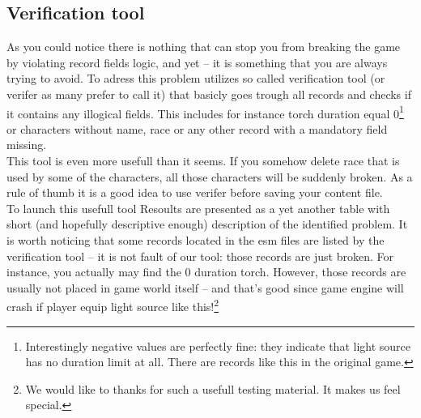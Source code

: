 \subsection{Verification tool}
As you could notice there is nothing that can stop you from breaking the game by violating record fields logic, and yet -- it is something that you are always trying to avoid. To adress this problem \OCS{} utilizes so called verification tool (or verifer as many prefer to call it) that basicly goes trough all records and checks if it contains any illogical fields. This includes for instance torch duration equal 0\footnote{Interestingly negative values are perfectly fine: they indicate that light source has no duration limit at all. There are records like this in the original game.} or characters without name, race or any other record with a mandatory field missing.\\
This tool is even more usefull than it seems. If you somehow delete race that is used by some of the characters, all those characters will be suddenly broken. As a rule of thumb it is a good idea to use verifer before saving your content file.\\
To launch this usefull tool %
Resoults are presented as a yet another table with short (and hopefully descriptive enough) description of the identified problem. It is worth noticing that some records located in the \MW{} esm files are listed by the verification tool -- it is not fault of our tool: those records are just broken. For instance, you actually may find the 0 duration torch. However, those records are usually not placed in game world itself -- and that's good since \MW{} game engine will crash if player equip light source like this!\footnote{We would like to thanks \BS{} for such a usefull testing material. It makes us feel special.}
